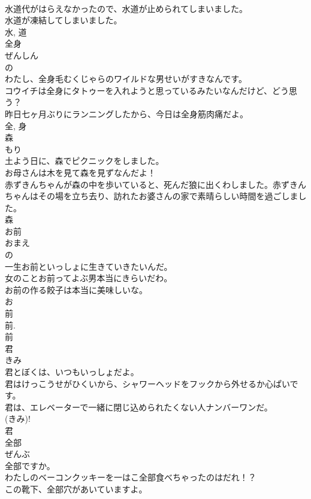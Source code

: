 \documentclass[8pt]{extreport}
\begin{document}
\begin{CJK}{UTF8}{min}
\\	水道代がはらえなかったので、水道が止められてしまいました。	
\\	水道が凍結してしまいました。	
\\	水, 道	
\\	全身	
\\	ぜんしん	
\\	の 
\\	わたし、全身毛むくじゃらのワイルドな男せいがすきなんです。	
\\	コウイチは全身にタトゥーを入れようと思っているみたいなんだけど、どう思う？	
\\	昨日七ヶ月ぶりにランニングしたから、今日は全身筋肉痛だよ。	
\\	全, 身	
\\	森	
\\	もり	
\\	土よう日に、森でピクニックをしました。	
\\	お母さんは木を見て森を見ずなんだよ！	
\\	赤ずきんちゃんが森の中を歩いていると、死んだ狼に出くわしました。赤ずきんちゃんはその場を立ち去り、訪れたお婆さんの家で素晴らしい時間を過ごしました。	
\\	森	
\\	お前	
\\	おまえ	
\\	の 
\\	一生お前といっしょに生きていきたいんだ。	
\\	女のことお前ってよぶ男本当にきらいだわ。	
\\	お前の作る餃子は本当に美味しいな。	
\\	お 
\\	前 
\\	前. 
\\	前	
\\	君	
\\	きみ	
\\	君とぼくは、いつもいっしょだよ。	
\\	君はけっこうせがひくいから、シャワーヘッドをフックから外せるか心ぱいです。	
\\	君は、エレベーターで一緒に閉じ込められたくない人ナンバーワンだ。	
\\	(きみ)! 
\\	君	
\\	全部	
\\	ぜんぶ	
\\	全部ですか。	
\\	わたしのベーコンクッキーを一はこ全部食べちゃったのはだれ！？	
\\	この靴下、全部穴があいていますよ。	

\end{CJK}
\end{document}
